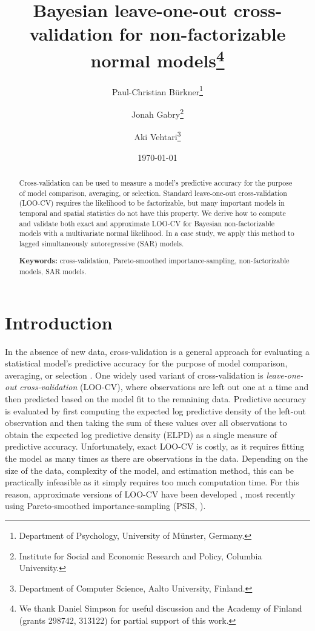 \documentclass[11pt]{article}
\title{\bf Bayesian leave-one-out cross-validation for non-factorizable normal models\footnote{
We thank Daniel Simpson for useful discussion and the Academy of Finland
(grants 298742, 313122) for partial support of this work.
}\vspace{.1in}}
\author{Paul-Christian B\"{u}rkner\footnote{Department of Psychology, University of M\"{u}nster, Germany.}
  \and Jonah Gabry\footnote{Institute for Social and Economic Research and Policy, Columbia University.}
  \and Aki Vehtari\footnote{Department of Computer Science, Aalto University, Finland.
}\vspace{.1in}}
\date{\today \vspace{-.1in}}
\begin{document}
\sloppy
\maketitle
\thispagestyle{empty}

\begin{abstract}
Cross-validation can be used to measure a model's predictive accuracy for the
purpose  of model comparison, averaging, or selection. Standard leave-one-out
cross-validation  (LOO-CV) requires the likelihood to be factorizable, but many
important models in temporal  and spatial statistics do not have this property.
We derive how to compute and validate both exact and approximate LOO-CV for
Bayesian non-factorizable models with a multivariate normal likelihood.
In a case study, we apply this method to lagged simultaneously autoregressive 
(SAR) models.

\textbf{Keywords:} cross-validation, Pareto-smoothed importance-sampling,
  non-factorizable models, SAR models.
\end{abstract}


\section{Introduction}

In the absence of new data, cross-validation is a general approach for evaluating
a statistical model's predictive accuracy for the purpose of model comparison, 
averaging, or selection \citep{geisser1979, hoeting1999, ando2010, vehtari2012}.
One widely used variant of
cross-validation is \emph{leave-one-out cross-validation} (LOO-CV), where
observations are left out one at a time and then predicted based on the model
fit to the remaining data. Predictive accuracy is evaluated by first computing
the expected log predictive density of the left-out observation and then taking
the sum of these values over all observations to obtain the expected log
predictive density (ELPD) as a single measure of predictive accuracy.
Unfortunately, exact LOO-CV is costly, as it requires fitting the model as many
times as there are observations in the data. Depending on the size of the data,
complexity of the model, and estimation method, this can be practically
infeasible as it simply requires too much computation time. 
For this reason, approximate versions of LOO-CV have been developed 
\citep{gelfand1992, vehtari2017loo}, most recently using 
Pareto-smoothed importance-sampling (PSIS, \cite{vehtari2017loo, vehtari2017psis}).
\end{document}
